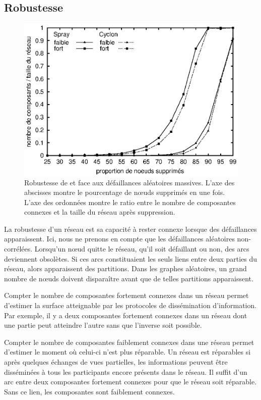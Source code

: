 \subsection{Robustesse}
\label{net:subsec:robustness}

\begin{figure}
  \centering
  \includegraphics[width=.8\textwidth]{img/spray/resilience.eps}
  \caption[Robustesse aux pannes aléatoires] {\label{net:fig:robustness}
    Robustesse de \CYCLON et \SPRAY face aux défaillances aléatoires
    massives. L'axe des abscisses montre le pourcentage de nœuds supprimés en une
    fois. L'axe des ordonnées montre le ratio entre le nombre de composantes
    connexes et la taille du réseau après suppression.}
\end{figure}

La robustesse d'un réseau est sa capacité à rester connexe lorsque des
défaillances apparaissent. Ici, nous ne prenons en compte que les défaillances
aléatoires non-corrélées. Lorsqu'un nœud quitte le réseau, qu'il soit défaillant
ou non, des arcs deviennent obsolètes. Si ces arcs constituaient les seuls liens
entre deux parties du réseau, alors apparaissent des partitions.  Dans les
graphes aléatoires, un grand nombre de nœuds doivent disparaître avant que de
telles partitions apparaissent.

Compter le nombre de composantes fortement connexes dans un réseau permet
d'estimer la surface atteignable par les protocoles de dissémination
d'information. Par exemple, il y a deux composantes fortement connexes dans un
réseau dont une partie peut atteindre l'autre sans que l'inverse soit
possible.

Compter le nombre de composantes faiblement connexes dans une réseau permet
d'estimer le moment où celui-ci n'est plus réparable. Un réseau est réparables
si après quelques échanges de vues partielles, les informations peuvent être
disséminées à tous les participants encore présents dans le réseau. Il suffit
d'un arc entre deux composantes fortement connexes pour que le réseau soit
réparable. Sans ce lien, les composantes sont faiblement connexes.

